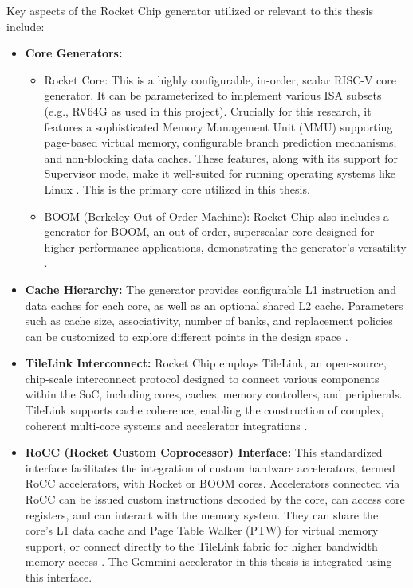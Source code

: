 Key aspects of the Rocket Chip generator utilized or relevant to this thesis include:
\begin{itemize}
    \item \textbf{Core Generators:}
    \begin{itemize}
        \item Rocket Core: This is a highly configurable, in-order, scalar RISC-V core generator. It can be parameterized to implement various ISA subsets (e.g., RV64G as used in this project). Crucially for this research, it features a sophisticated Memory Management Unit (MMU) supporting page-based virtual memory, configurable branch prediction mechanisms, and non-blocking data caches. These features, along with its support for Supervisor mode, make it well-suited for running operating systems like Linux \cite[p.~4]{asanovic2016rocketchip}. This is the primary core utilized in this thesis.

        \item BOOM (Berkeley Out-of-Order Machine): Rocket Chip also includes a generator for BOOM, an out-of-order, superscalar core designed for higher performance applications, demonstrating the generator's versatility \cite[p.~5]{asanovic2016rocketchip}.
    \end{itemize}

    \item \textbf{Cache Hierarchy:} The generator provides configurable L1 instruction and data caches for each core, as well as an optional shared L2 cache. Parameters such as cache size, associativity, number of banks, and replacement policies can be customized to explore different points in the design space \cite[p.~3]{asanovic2016rocketchip}.

    \item \textbf{TileLink Interconnect:} Rocket Chip employs TileLink, an open-source, chip-scale interconnect protocol designed to connect various components within the SoC, including cores, caches, memory controllers, and peripherals. TileLink supports cache coherence, enabling the construction of complex, coherent multi-core systems and accelerator integrations \cite[p.~6]{asanovic2016rocketchip} \cite[p.~15]{chipyard}.

    \item \textbf{RoCC (Rocket Custom Coprocessor) Interface:} This standardized interface facilitates the integration of custom hardware accelerators, termed RoCC accelerators, with Rocket or BOOM cores. Accelerators connected via RoCC can be issued custom instructions decoded by the core, can access core registers, and can interact with the memory system. They can share the core's L1 data cache and Page Table Walker (PTW) for virtual memory support, or connect directly to the TileLink fabric for higher bandwidth memory access \cite[p.~5]{asanovic2016rocketchip} \cite[p.~13]{chipyard}. The Gemmini accelerator in this thesis is integrated using this interface.
\end{itemize}


